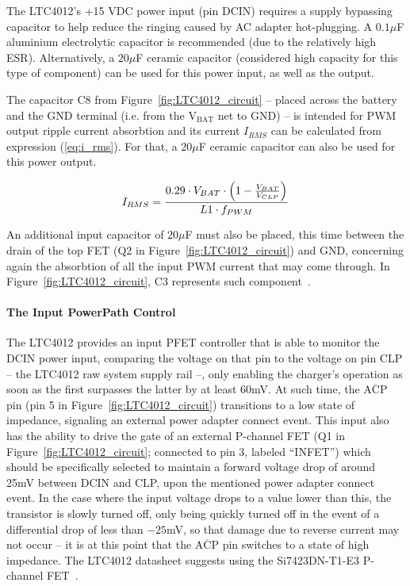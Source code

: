 The LTC4012's +15 VDC power input (pin DCIN) requires a supply bypassing capacitor to help reduce the \gls{ringing} caused by AC adapter \gls{hot-plugging}. A $0.1 \mu$F aluminium electrolytic capacitor is recommended (due to the relatively high \gls{ESR}). Alternatively, a $20 \mu$F ceramic capacitor (considered high capacity for this type of component) can be used for this power input, as well as the output.

The capacitor C8 from Figure~\ref{fig:LTC4012_circuit} -- placed across the battery and the GND terminal (i.e. from the $\mathrm{V_{BAT}}$ net to GND) -- is intended for PWM output ripple current absorbtion and its current $I_{RMS}$ can be calculated from expression (\ref{eq:i_rms}). For that, a $20 \mu$F ceramic capacitor can also be used for this power output.

\begin{equation}\label{eq:i_rms}
    I_{RMS}=\frac{0.29 \cdot V_{BAT} \cdot \left(1- \frac{V_{BAT}}{V_{CLP}}\right)}{L1 \cdot f_{PWM}}\,\medskip
\end{equation}

An additional input capacitor of $20 \mu$F must also be placed, this time between the drain of the top FET (Q2 in Figure~\ref{fig:LTC4012_circuit}) and GND, concerning again the absorbtion of all the input PWM current that may come through. In Figure~\ref{fig:LTC4012_circuit}, C3 represents such component~\cite{LTC4012}.

\paragraph{The Input PowerPath Control}	The LTC4012 provides an input PFET controller that is able to monitor the DCIN power input, comparing the voltage on that pin to the voltage on pin CLP -- the LTC4012 raw system supply rail --, only enabling the charger's operation as soon as the first surpasses the latter by at least 60mV. At such time, the $\overline{\mbox{ACP}}$ pin (pin 5 in Figure~\ref{fig:LTC4012_circuit}) transitions to a low state of impedance, signaling an external power adapter connect event. This input also has the ability to drive the gate of an external P-channel FET (Q1 in Figure~\ref{fig:LTC4012_circuit}; connected to pin 3, labeled ``INFET'') which should be specifically selected to maintain a forward voltage drop of around 25mV between DCIN and CLP, upon the mentioned power adapter connect event. In the case where the input voltage drops to a value lower than this, the transistor is slowly turned off, only being quickly turned off in the event of a differential drop of less than $-25$mV, so that damage due to reverse current may not occur -- it is at this point that the $\overline{\mbox{ACP}}$ pin switches to a state of high impedance. The LTC4012 datasheet suggests using the Si7423DN-T1-E3 P-channel FET~\cite{LTC4012}.

